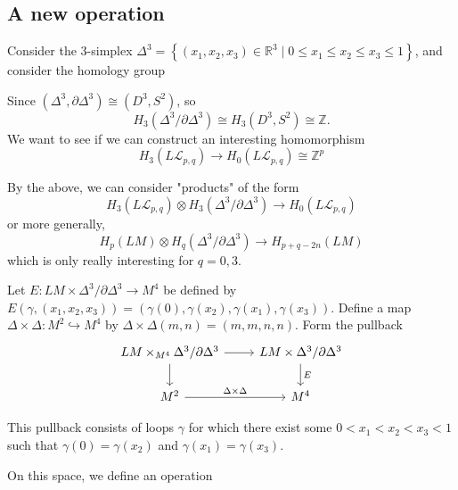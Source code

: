 \documentclass[reqno]{amsart}
\theoremstyle{definition}
\theoremstyle{remark}
\begin{document}
\newpage

\subsection{A new operation}


Consider the $3$-simplex
$\Delta^3 = \left\{ \left( x_1,x_2,x_3 \right) \in \mathbb{R}^3  \mid 
0 \le x_1 \le x_2 \le x_3 \le 1\right\} $, and
consider the homology group

Since $\left( \Delta^3, \partial \Delta^3 \right) 
\cong \left( D^3, S^2 \right) $,
so
\[
H_3 \left( \Delta^3 / \partial \Delta^3 \right) \cong
H_3 \left( D^3, S^2 \right) \cong
\mathbb{Z}.
\] 
We want to see if we can construct an interesting
homomorphism
\[
H_3 \left( L \mathcal{L}_{p,q} \right) \to 
H_0 \left( L \mathcal{L}_{p,q} \right) 
\cong \mathbb{Z}^{p}
\] 

By the above, we can consider "products" of the form
\[
H_3 \left( L \mathcal{L}_{p,q} \right) \otimes
H_3 \left( \Delta^3 / \partial \Delta^3 \right) 
\to H_0 \left( L \mathcal{L}_{p,q} \right) 
\] 
or more generally,
\[
H_p \left( LM \right) \otimes
H_q \left( \Delta^3 / \partial \Delta^3 \right) \to 
H_{p+q-2n}\left( LM \right) 
\] 
which is only really interesting for
$q = 0,3$.\\
\linebreak




Let $E \colon
LM \times \Delta^3 / \partial \Delta^3 \to 
M^{4}$ be defined by
$E\left(\gamma, \left( x_1,x_2,x_3 \right)  \right) = 
\left( \gamma(0), \gamma(x_2), \gamma(x_1),
\gamma(x_3)\right)  $. Define
a map $\Delta \times \Delta\colon M^2 \hookrightarrow M^{4}$ by
$\Delta \times \Delta \left( m,n \right) = 
\left( m,m,n,n \right) $.
Form the pullback
\begin{equation*}
\begin{tikzcd}
    LM \times_{M^{4}} \Delta^3 / \partial \Delta^3
    \ar[r] \ar[d] & LM \times \Delta^3 / \partial \Delta^3
    \ar[d, "E"] \\
    M^2 \ar[r, "\Delta \times \Delta"] & M^{4}
\end{tikzcd}
\end{equation*}

This pullback consists of loops $\gamma$ for which
there exist some
$0 < x_1 < x_2 < x_3 < 1$ such that
$\gamma (0) = \gamma(x_2)$ and
$\gamma(x_1) = \gamma(x_3)$.

On this space, we define an operation
\end{document}
